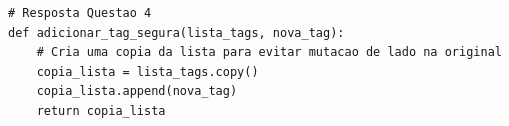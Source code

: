 \ifmostrarGabarito
\begin{verbatim}
# Resposta Questao 4
def adicionar_tag_segura(lista_tags, nova_tag):
    # Cria uma copia da lista para evitar mutacao de lado na original
    copia_lista = lista_tags.copy()
    copia_lista.append(nova_tag)
    return copia_lista
\end{verbatim}
\fi
